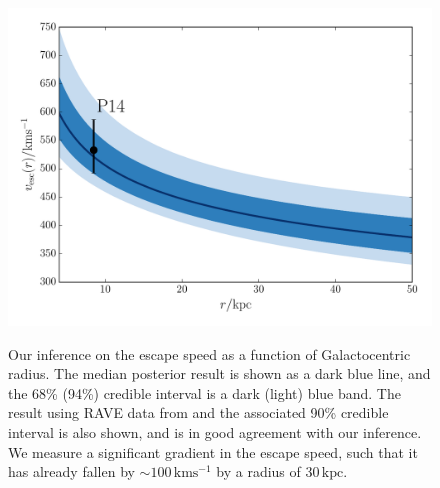 \documentclass[useAMS,twocolumn,usenatbib]{mn2e}
\def\kpc{{\,\mathrm{kpc}}}
\def\kms{{\,\mathrm{kms^{-1}}}}
\begin{document}
\begin{figure}
\includegraphics[width=\columnwidth]{plots/vesc_posterior}\\
\caption{Our inference on the escape speed as a function of Galactocentric radius. 
The median posterior result is shown as a {} dark blue line, and the 68\% (94\%) credible interval is a dark (light) blue band. 
The result using RAVE data from \citet{Pi14} and the associated 90\% credible interval is also shown, and is in good agreement with our inference. 
We measure a significant gradient in the escape speed, such that it has already fallen by $\sim 100\kms$ by  a radius of $30\kpc$.}
\label{fig:vesc_posterior}
\end{figure}
\end{document}
